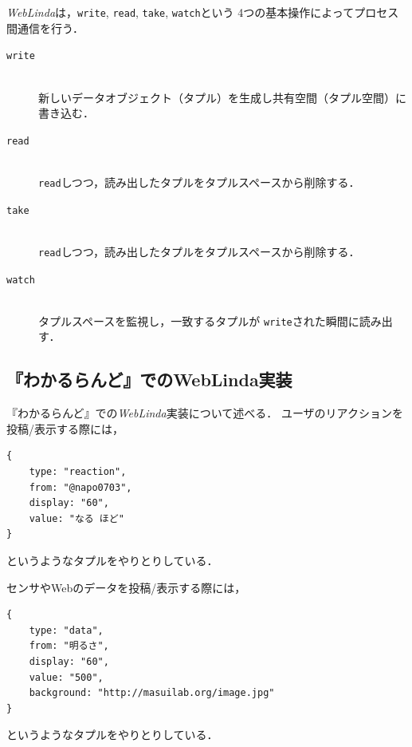 \textit{WebLinda}は，\texttt{write}, \texttt{read}, \texttt{take}, \texttt{watch}という
4つの基本操作によってプロセス間通信を行う．

\vspace{2mm}
\begin{description}
\item[\texttt{write}]\mbox{}\\
新しいデータオブジェクト（タプル）を生成し共有空間（タプル空間）に書き込む．
\item[\texttt{read}]\mbox{}\\
\texttt{read}しつつ，読み出したタプルをタプルスペースから削除する．
\item[\texttt{take}]\mbox{}\\
\texttt{read}しつつ，読み出したタプルをタプルスペースから削除する．
\item[\texttt{watch}]\mbox{}\\
タプルスペースを監視し，一致するタプルが
\texttt{write}された瞬間に読み出す．
\end{description}

\subsection{『わかるらんど』でのWebLinda実装}
『わかるらんど』での\textit{WebLinda}実装について述べる．
ユーザのリアクションを投稿/表示する際には，

\begin{lstlisting}
{
    type: "reaction",
    from: "@napo0703",
    display: "60",
    value: "なる ほど"
}
\end{lstlisting}
というようなタプルをやりとりしている．

センサやWebのデータを投稿/表示する際には，
\begin{lstlisting}
{
    type: "data",
    from: "明るさ",
    display: "60",
    value: "500",
    background: "http://masuilab.org/image.jpg"
}
\end{lstlisting}
というようなタプルをやりとりしている．

